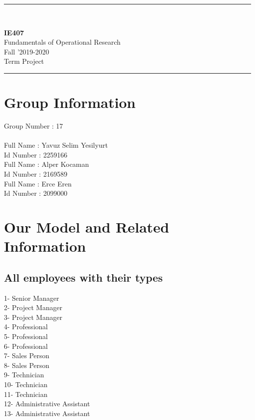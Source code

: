 \documentclass[12pt]{article}
\newcommand{\HRule}{\rule{\linewidth}{1mm}}
\begin{document}
\noindent
\HRule \\[3mm]
\begin{flushright}

                                         \LARGE \textbf{IE407}  \\[4mm]
                                         \Large Fundamentals of Operational Research\\[4mm]
                                        \normalsize      Fall '2019-2020 \\
                                           \Large   Term Project \\
\end{flushright}
\HRule

\section*{Group Information}
Group Number : 17 \\\\
Full Name : Yavuz Selim Yesilyurt \\
Id Number : 2259166 \\
Full Name : Alper Kocaman \\
Id Number : 2169589 \\
Full Name : Erce Eren \\
Id Number : 2099000 \\ 


\section*{Our Model and Related Information}
\subsection*{All employees with their types} 

1- Senior Manager \\
2- Project Manager \\
3- Project Manager \\
4- Professional \\
5- Professional \\
6- Professional \\
7- Sales Person \\
8- Sales Person \\
9- Technician \\
10- Technician \\
11- Technician \\
12- Administrative Assistant \\
13- Administrative Assistant 
\end{document}
